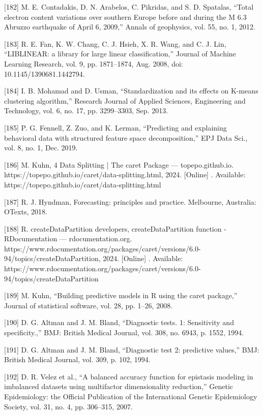 \documentclass[sn-mathphys-num]{sn-jnl}%
\begin{document}
[182] M. E. Contadakis, D. N. Arabelos, C. Pikridas, and S. D. Spatalas, “Total electron content variations over southern Europe before and during the M 6.3 Abruzzo earthquake of April 6, 2009,” Annals of geophysics, vol. 55, no. 1, 2012.

[183] R. E. Fan, K. W. Chang, C. J. Hsieh, X. R. Wang, and C. J. Lin, “LIBLINEAR: a library for large linear classification,” Journal of Machine Learning Research, vol. 9, pp. 1871–1874, Aug. 2008, doi: 10.1145/1390681.1442794.

[184] I. B. Mohamad and D. Usman, “Standardization and its effects on K-means clustering algorithm,” Research Journal of Applied Sciences, Engineering and Technology, vol. 6, no. 17, pp. 3299–3303, Sep. 2013.

[185] P. G. Fennell, Z. Zuo, and K. Lerman, “Predicting and explaining behavioral data with structured feature space decomposition,” EPJ Data Sci., vol. 8, no. 1, Dec. 2019.

[186] M. Kuhn, 4 Data Splitting | The caret Package — topepo.github.io. https://topepo.github.io/caret/data-splitting.html, 2024. [Online] . Available: https://topepo.github.io/caret/data-splitting.html

[187] R. J. Hyndman, Forecasting: principles and practice. Melbourne, Australia: OTexts, 2018.

[188] R. createDataPartition developers, createDataPartition function - RDocumentation — rdocumentation.org. https://www.rdocumentation.org/packages/caret/versions/6.0-94/topics/createDataPartition, 2024. [Online] . Available: https://www.rdocumentation.org/packages/caret/versions/6.0-94/topics/createDataPartition

[189] M. Kuhn, “Building predictive models in R using the caret package,” Journal of statistical software, vol. 28, pp. 1–26, 2008.

[190] D. G. Altman and J. M. Bland, “Diagnostic tests. 1: Sensitivity and specificity.,” BMJ: British Medical Journal, vol. 308, no. 6943, p. 1552, 1994.

[191] D. G. Altman and J. M. Bland, “Diagnostic test 2: predictive values,” BMJ: British Medical Journal, vol. 309, p. 102, 1994.

[192] D. R. Velez et al., “A balanced accuracy function for epistasis modeling in imbalanced datasets using multifactor dimensionality reduction,” Genetic Epidemiology: the Official Publication of the International Genetic Epidemiology Society, vol. 31, no. 4, pp. 306–315, 2007.
\end{document}
